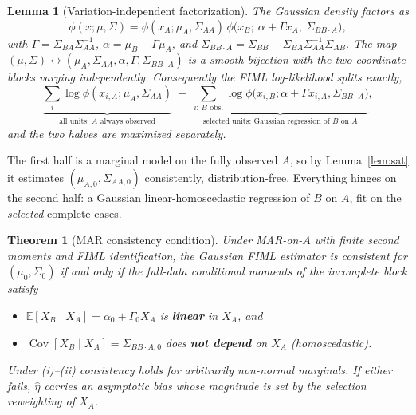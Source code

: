 \documentclass[11pt]{article}
\newcommand{\E}{\mathbb{E}}
\newcommand{\Cov}{\operatorname{Cov}}
\theoremstyle{plain}
\newtheorem{theorem}{Theorem}
\newtheorem{lemma}{Lemma}
\theoremstyle{remark}
\begin{document}
\begin{lemma}[Variation-independent factorization]\label{lem:factor}
The Gaussian density factors as
\[
  \phi(x;\mu,\Sigma)
   = \phi(x_A;\mu_A,\Sigma_{AA})\,
     \phi\!\big(x_B;\ \alpha+\Gamma x_A,\ \Sigma_{BB\cdot A}\big),
\]
with $\Gamma=\Sigma_{BA}\Sigma_{AA}^{-1}$,
$\alpha=\mu_B-\Gamma\mu_A$, and
$\Sigma_{BB\cdot A}=\Sigma_{BB}-\Sigma_{BA}\Sigma_{AA}^{-1}\Sigma_{AB}$. The map
$(\mu,\Sigma)\leftrightarrow(\mu_A,\Sigma_{AA},\alpha,\Gamma,\Sigma_{BB\cdot A})$
is a smooth bijection with the two coordinate blocks varying independently.
Consequently the FIML log-likelihood splits exactly,
\[
  \underbrace{\sum_{i} \log\phi(x_{i,A};\mu_A,\Sigma_{AA})}_{\text{all units: }A\text{ always observed}}
  \;+\;
  \underbrace{\sum_{i:\,B\text{ obs.}} \log\phi\big(x_{i,B};\alpha+\Gamma x_{i,A},\Sigma_{BB\cdot A}\big)}_{\text{selected units: Gaussian regression of }B\text{ on }A},
\]
and the two halves are maximized separately.
\end{lemma}

The first half is a marginal model on the fully observed $A$, so by
Lemma~\ref{lem:sat} it estimates $(\mu_{A,0},\Sigma_{AA,0})$ consistently,
distribution-free. Everything hinges on the second half: a Gaussian
linear-homoscedastic regression of $B$ on $A$, fit on the \emph{selected}
complete cases.

\begin{theorem}[MAR consistency condition]\label{thm:mar}
Under MAR-on-$A$ with finite second moments and FIML identification, the
Gaussian FIML estimator is consistent for $(\mu_0,\Sigma_0)$ if and only if the
full-data conditional moments of the incomplete block satisfy
\begin{itemize}
  \item[(i)] $\E[X_B\mid X_A]=\alpha_0+\Gamma_0 X_A$ is \textbf{linear} in
        $X_A$, and
  \item[(ii)] $\Cov[X_B\mid X_A]=\Sigma_{BB\cdot A,0}$ does \textbf{not depend}
        on $X_A$ (homoscedastic).
\end{itemize}
Under (i)--(ii) consistency holds for arbitrarily non-normal marginals. If
either fails, $\hat\eta$ carries an asymptotic bias whose magnitude is set by the
selection reweighting of $X_A$.
\end{theorem}
\end{document}
